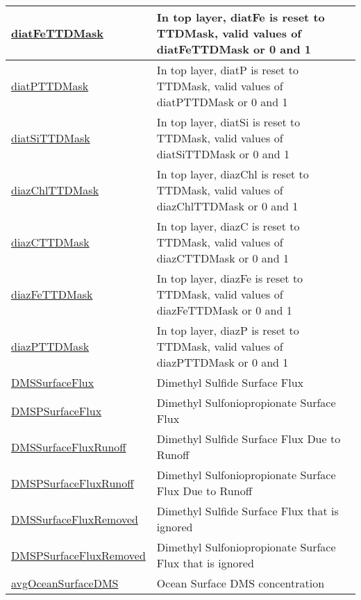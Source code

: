 {\begin{center}
\begin{longtable}{| p{2.0in} | p{4.0in} |}
    \hyperref[subsec:var_sec_forcing_diatFeTTDMask]{diatFeTTDMask} & In top layer, diatFe is reset to TTDMask, valid values of diatFeTTDMask or 0 and 1 \\
    \hline
    \hyperref[subsec:var_sec_forcing_diatPTTDMask]{diatPTTDMask} & In top layer, diatP is reset to TTDMask, valid values of diatPTTDMask or 0 and 1 \\
    \hline
    \hyperref[subsec:var_sec_forcing_diatSiTTDMask]{diatSiTTDMask} & In top layer, diatSi is reset to TTDMask, valid values of diatSiTTDMask or 0 and 1 \\
    \hline
    \hyperref[subsec:var_sec_forcing_diazChlTTDMask]{diazChlTTDMask} & In top layer, diazChl is reset to TTDMask, valid values of diazChlTTDMask or 0 and 1 \\
    \hline
    \hyperref[subsec:var_sec_forcing_diazCTTDMask]{diazCTTDMask} & In top layer, diazC is reset to TTDMask, valid values of diazCTTDMask or 0 and 1 \\
    \hline
    \hyperref[subsec:var_sec_forcing_diazFeTTDMask]{diazFeTTDMask} & In top layer, diazFe is reset to TTDMask, valid values of diazFeTTDMask or 0 and 1 \\
    \hline
    \hyperref[subsec:var_sec_forcing_diazPTTDMask]{diazPTTDMask} & In top layer, diazP is reset to TTDMask, valid values of diazPTTDMask or 0 and 1 \\
    \hline
    \hyperref[subsec:var_sec_forcing_DMSSurfaceFlux]{DMSSurfaceFlux} & Dimethyl Sulfide Surface Flux \\
    \hline
    \hyperref[subsec:var_sec_forcing_DMSPSurfaceFlux]{DMSPSurfaceFlux} & Dimethyl Sulfoniopropionate Surface Flux \\
    \hline
    \hyperref[subsec:var_sec_forcing_DMSSurfaceFluxRunoff]{DMSSurfaceFluxRunoff} & Dimethyl Sulfide Surface Flux Due to Runoff \\
    \hline
    \hyperref[subsec:var_sec_forcing_DMSPSurfaceFluxRunoff]{DMSPSurfaceFluxRunoff} & Dimethyl Sulfoniopropionate Surface Flux Due to Runoff \\
    \hline
    \hyperref[subsec:var_sec_forcing_DMSSurfaceFluxRemoved]{DMSSurfaceFluxRemoved} & Dimethyl Sulfide Surface Flux that is ignored \\
    \hline
    \hyperref[subsec:var_sec_forcing_DMSPSurfaceFluxRemoved]{DMSPSurfaceFluxRemoved} & Dimethyl Sulfoniopropionate Surface Flux that is ignored \\
    \hline
    \hyperref[subsec:var_sec_forcing_avgOceanSurfaceDMS]{avgOceanSurfaceDMS} & Ocean Surface DMS concentration \\

\end{longtable}
\end{center}}

